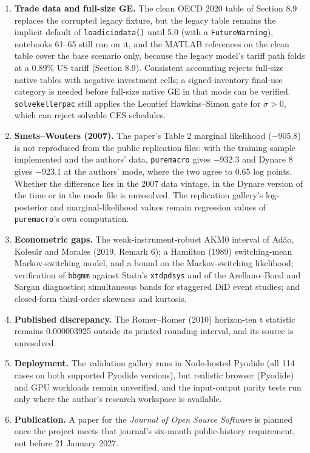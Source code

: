 \documentclass[11pt,letterpaper]{article}
\providecommand{\tightlist}{\setlength{\itemsep}{0pt}\setlength{\parskip}{0pt}}
\renewcommand{\_}{\pmunderscore\allowbreak}
\begin{document}
\begin{enumerate}
\def\labelenumi{\arabic{enumi}.}
\tightlist
\item
  \textbf{Trade data and full-size GE.} The clean OECD 2020 table of Section 8.9 replaces the corrupted legacy fixture, but the legacy table remains the implicit default of \texttt{load\_icio\_data()} until 5.0 (with a \texttt{FutureWarning}), notebooks 61--65 still run on it, and the MATLAB references on the clean table cover the base scenario only, because the legacy model's tariff path folds at a 0.89\% US tariff (Section 8.9). Consistent accounting rejects full-size native tables with negative investment cells; a signed-inventory final-use category is needed before full-size native GE in that mode can be verified. \texttt{solve\_keller\_pac} still applies the Leontief Hawkins--Simon gate for \(\sigma > 0\), which can reject solvable CES schedules.
\item
  \textbf{Smets--Wouters (2007).} The paper's Table 2 marginal likelihood (−905.8) is not reproduced from the public replication files: with the training sample implemented and the authors' data, \texttt{puremacro} gives −932.3 and Dynare 8 gives −923.1 at the authors' mode, where the two agree to 0.65 log points. Whether the difference lies in the 2007 data vintage, in the Dynare version of the time or in the mode file is unresolved. The replication gallery's log-posterior and marginal-likelihood values remain regression values of \texttt{puremacro}'s own computation.
\item
  \textbf{Econometric gaps.} The weak-instrument-robust AKM0 interval of Adão, Kolesár and Morales (2019, Remark 6); a Hamilton (1989) switching-mean Markov-switching model, and a bound on the Markov-switching likelihood; verification of \texttt{bb\_gmm} against Stata's \texttt{xtdpdsys} and of the Arellano--Bond and Sargan diagnostics; simultaneous bands for staggered DiD event studies; and closed-form third-order skewness and kurtosis.
\item
  \textbf{Published discrepancy.} The Romer--Romer (2010) horizon-ten t statistic remains 0.000003925 outside its printed rounding interval, and its source is unresolved.
\item
  \textbf{Deployment.} The validation gallery runs in Node-hosted Pyodide (all 114 cases on both supported Pyodide versions), but realistic browser (Pyodide) and GPU workloads remain unverified, and the input-output parity tests run only where the author's research workspace is available.
\item
  \textbf{Publication.} A paper for the \emph{Journal of Open Source Software} is planned once the project meets that journal's six-month public-history requirement, not before 21 January 2027.
\end{enumerate}
\end{document}

